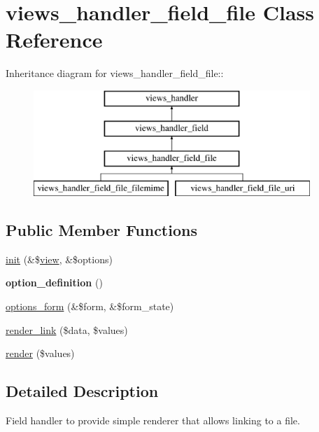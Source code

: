 \hypertarget{classviews__handler__field__file}{
\section{views\_\-handler\_\-field\_\-file Class Reference}
\label{classviews__handler__field__file}
}
Inheritance diagram for views\_\-handler\_\-field\_\-file::\begin{figure}[H]
\begin{center}
\leavevmode
\includegraphics[height=4cm]{classviews__handler__field__file}
\end{center}
\end{figure}
\subsection*{Public Member Functions}
\begin{DoxyCompactItemize}
\item 
\hyperlink{classviews__handler__field__file_aa0c76118aaf12d0938111d093411c016}{init} (\&\$\hyperlink{classview}{view}, \&\$options)
\item 
\hypertarget{classviews__handler__field__file_a0bf24a6e9139daa5206f209b39aea824}{
{\bfseries option\_\-definition} ()}
\label{classviews__handler__field__file_a0bf24a6e9139daa5206f209b39aea824}

\item 
\hyperlink{classviews__handler__field__file_aab95242357e45be9c4fbbced1f625d7b}{options\_\-form} (\&\$form, \&\$form\_\-state)
\item 
\hyperlink{classviews__handler__field__file_a01e20dce2e91288a77521c1564754d03}{render\_\-link} (\$data, \$values)
\item 
\hyperlink{classviews__handler__field__file_a624c3ed9f9f4b194e2a9a0b7d6acb384}{render} (\$values)
\end{DoxyCompactItemize}


\subsection{Detailed Description}
Field handler to provide simple renderer that allows linking to a file. 

